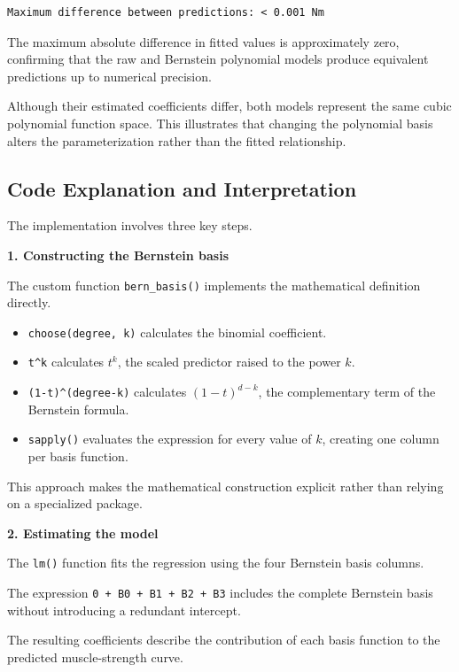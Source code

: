 \documentclass[
  letterpaper,
  DIV=11,
  numbers=noendperiod]{scrreprt}
\providecommand{\tightlist}{%
  \setlength{\itemsep}{0pt}\setlength{\parskip}{0pt}}
\begin{document}
\begin{verbatim}
Maximum difference between predictions: < 0.001 Nm
\end{verbatim}

The maximum absolute difference in fitted values is approximately zero,
confirming that the raw and Bernstein polynomial models produce
equivalent predictions up to numerical precision.

Although their estimated coefficients differ, both models represent the
same cubic polynomial function space. This illustrates that changing the
polynomial basis alters the parameterization rather than the fitted
relationship.

\subsection{Code Explanation and
Interpretation}\label{code-explanation-and-interpretation-1}

The implementation involves three key steps.

\textbf{1. Constructing the Bernstein basis}

The custom function \texttt{bern\_basis()} implements the mathematical
definition directly.

\begin{itemize}
\tightlist
\item
  \texttt{choose(degree,\ k)} calculates the binomial coefficient.
\item
  \texttt{t\^{}k} calculates \(t^k\), the scaled predictor raised to the
  power \(k\).
\item
  \texttt{(1-t)\^{}(degree-k)} calculates \((1-t)^{d-k}\), the
  complementary term of the Bernstein formula.
\item
  \texttt{sapply()} evaluates the expression for every value of \(k\),
  creating one column per basis function.
\end{itemize}

This approach makes the mathematical construction explicit rather than
relying on a specialized package.

\textbf{2. Estimating the model}

The \texttt{lm()} function fits the regression using the four Bernstein
basis columns.

The expression \texttt{0\ +\ B0\ +\ B1\ +\ B2\ +\ B3} includes the
complete Bernstein basis without introducing a redundant intercept.

The resulting coefficients describe the contribution of each basis
function to the predicted muscle-strength curve.
\end{document}
